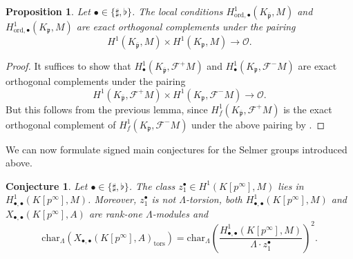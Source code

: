 \documentclass{amsart}
\numberwithin{equation}{section}
\newtheorem{proposition}[theorem]{Proposition}
\newtheorem{conjecture}[theorem]{Conjecture}
\newcommand{\frk}{\mathfrak}
\newcommand{\ord}{\mathrm{ord}}
\newcommand{\Char}{\mathrm{char}}
\begin{document}
\begin{proposition}
    Let $\bullet\in \lbrace \sharp,\flat\rbrace$. The local conditions $H^1_{\ord,\bullet}(K_{\overline{\frk{p}}},M)$ and $H^1_{\ord,\bullet}(K_\frk{p},M)$ are exact orthogonal complements under the pairing
    \begin{equation*}
    H^1(K_{\overline{\frk{p}}},M)\times H^1(K_\frk{p},M) \longrightarrow\mathcal{O}.
    \end{equation*}
\end{proposition}
\begin{proof}
    It suffices to show that $H^1_{\bullet}(K_{\overline{\frk{p}}},\mathscr{F}^+M)$ and $H^1_{\bullet}(K_{\frk{p}},\mathscr{F}^-M)$ are exact orthogonal complements under the pairing
    \begin{equation*}
    H^1(K_{\overline{\frk{p}}},\mathscr{F}^+M)\times H^1(K_\frk{p},\mathscr{F}^-M) \longrightarrow\mathcal{O}.
    \end{equation*}
    But this follows from the previous lemma, since $H^1_f(K_{\overline{\frk{p}}},\mathscr{F}^+M)$ is the exact orthogonal complement of $H^1_f(K_{\frk{p}},\mathscr{F}^-M)$ under the above pairing by \cite[Proposition~3.8]{blochkato}.
\end{proof}

We can now formulate signed main conjectures for the Selmer groups introduced above.

\begin{conjecture}
    Let $\bullet\in \lbrace \sharp,\flat\rbrace$. The class $z_1^\bullet\in H^1(K[p^\infty],M)$ lies in $H^1_{\bullet,\bullet}(K[p^\infty],M)$. Moreover, $z_1^\bullet$ is not $\Lambda$-torsion, both $H^1_{\bullet,\bullet}(K[p^\infty],M)$ and $X_{\bullet,\bullet}(K[p^\infty],A)$ are rank-one $\Lambda$-modules and
    \[
    \Char_{\Lambda}\left(X_{\bullet,\bullet}(K[p^\infty],A)_{\mathrm{tors}}\right)=\Char_\Lambda\left(\frac{H^1_{\bullet,\bullet}(K[p^\infty],M)}{\Lambda \cdot z_1^\bullet}\right)^2.
    \]
\end{conjecture}
\end{document}
